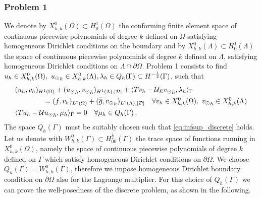 \subsubsection{Problem 1}
We denote by $X_{h,k}^0(\Omega)\subset H^1_0(\Omega)$ the conforming finite element space of continuous piecewise polynomials of degree $k$ defined on $\Omega$ satisfying homogeneous Dirichlet conditions on the boundary and by $X_{h,k}^0(\Lambda)\subset H^1_0(\Lambda)$ the space of continuous piecewise polynomials of degree $k$ defined on $\Lambda$, satisfying homogeneous Dirichlet conditions on $\Lambda \cap \partial \Omega$. 
Problem 1 consists to find $u_h \in X_{h,k}^0 (\Omega) ,\ {u_{\odot}}_h \in X_{h,k}^0(\Lambda) , \lambda_h \in Q_h(\Gamma) \subset H^{-\frac12}(\Gamma )$, such that
\begin{subequations}
\begin{align}
&(u_h,v_h)_{H^1(\Omega)} + ({u_{\odot}}_h,{v_{\odot}}_h)_{H^1(\Lambda),|\mathcal{D}|} 
+ \langle T v_h  - \mathcal{U}_E {v_{\odot}}_h, \lambda_h \rangle_\Gamma 
\\
\nonumber
&\qquad\qquad= (f,v_h)_{L^2(\Omega)} + (\overline{\overline{g}},{v_{\odot}}_h)_{L^2(\Lambda),|\mathcal{D}|}
\quad \forall v_h \in X_{h,k}^0(\Omega), \ {v_{\odot}}_h \in X_{h,k}^0(\Lambda)
\\
&   \langle T u_h - \mathcal{U} {u_{\odot}}_h , \mu_h \rangle_\Gamma = 0
\quad \forall \mu_h \in Q_h(\Gamma)\,,
\end{align}
\end{subequations}
The space $Q_h(\Gamma)$ must be suitably chosen such that \eqref{eq:infsup_discrete} holds. Let us denote with $W_{h,k}^0(\Gamma) \subset H^{\frac 12}_{00}(\Gamma)$ the trace space of functions running in $X_{h,k}^0(\Omega)$, namely the space of continuous piecewise polynomials of degree $k$ defined on $\Gamma$ which satisfy homogeneous Dirichlet conditions on $\partial \Omega$. We choose $Q_h(\Gamma)=W_{h,k}^0(\Gamma)$, therefore we impose homogeneous Dirichlet boundary condition on $\partial \Omega$ also for the Lagrange multiplier. For this choice of $Q_h(\Gamma)$ we can prove the well-posedness of the discrete problem, as shown in the following. 

